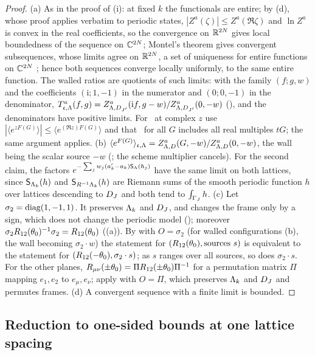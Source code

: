 \begin{proof}
(a) As in the proof of (i): at fixed $k$ the functionals are entire; by (d), whose proof applies verbatim to periodic states, $|Z^a(\zeta)|\le Z^a(\Re\zeta)$ and $\ln Z^a$ is convex in the real coefficients, so the convergence on $\mathbb R^{2N}$ gives local boundedness of the sequence on $\mathbb C^{2N}$; Montel's theorem gives convergent subsequences, whose limits agree on $\mathbb R^{2N}$, a set of uniqueness for entire functions on $\mathbb C^{2N}$ \cite{Hor90}; hence both sequences converge locally uniformly, to the same entire function. The walled ratios are quotients of such limits: with the family $(f;g,w)$ and the coefficients $(\mathrm i;1,-1)$ in the numerator and $(0;0,-1)$ in the denominator, $T^{a}_{\mathfrak c,\Lambda}(f,g)=Z^a_{\Lambda,D_{J'}}(\mathrm if,g-w)/Z^a_{\Lambda,D_{J'}}(0,-w)$ (), and the denominators have positive limits. For \Kz\ at complex $z$ use $|\langle e^{zF(G)}\rangle|\le\langle e^{(\Re z)F(G)}\rangle$ and that \Kz\ for all $G$ includes all real multiples $tG$; the same argument applies.
(b) $\langle e^{F(G)}\rangle_{\mathfrak c,\Lambda}=Z^a_{\Lambda,D}(G,-w)/Z^a_{\Lambda,D}(0,-w)$, the wall being the scalar source $-w$ (; the scheme multiplier cancels). For the second claim, the factors $e^{-\sum_jw_j(a'_k-a_k)\mathsf S_\Lambda(h_j)}$ have the same limit on both lattices, since $\mathsf S_{\Lambda_k}(h)$ and $\mathsf S_{R^{-1}\Lambda_k}(h)$ are Riemann sums of the smooth periodic function $h$ over lattices descending to $D_J$ and both tend to $\int_{\Gamma_J}h$.
(c) Let $\sigma_2=\operatorname{diag}(1,-1,1)$. It preserves $\Lambda_k$ and $D_J$, and changes the frame only by a sign, which does not change the periodic model (); moreover $\sigma_2R_{12}(\theta_0)^{-1}\sigma_2=R_{12}(\theta_0)$ ((a)). By  with $O=\sigma_2$ (for walled configurations (b), the wall becoming $\sigma_2\cdot w$) the statement for $(R_{12}(\theta_0),\text{sources }s)$ is equivalent to the statement for $(R_{12}(-\theta_0),\sigma_2\cdot s)$; as $s$ ranges over all sources, so does $\sigma_2\cdot s$. For the other planes, $R_{\mu\nu}(\pm\theta_0)=\Pi R_{12}(\pm\theta_0)\Pi^{-1}$ for a permutation matrix $\Pi$ mapping $e_1,e_2$ to $e_\mu,e_\nu$; apply  with $O=\Pi$, which preserves $\Lambda_k$ and $D_J$ and permutes frames.
(d) A convergent sequence with a finite limit is bounded.
\end{proof}

\subsection{Reduction to one-sided bounds at one lattice spacing}


